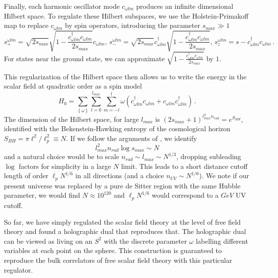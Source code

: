 \documentclass{brownthesis}
\begin{document}
Finally, each harmonic oscillator mode $c_{\omega lm}$ produces an
infinite dimensional Hilbert space. To regulate these Hilbert subspaces,
we use the Holstein-Primakoff map \cite{PhysRev.58.1098} to replace $c_{\omega lm}$
by spin operators, introducing the parameter $s_{max}\gg1$
\[
s_{+}^{\omega lm}=\sqrt{2s_{max}}\sqrt{1-\frac{c_{\omega lm}^{\dagger}c_{\omega lm}}{2s_{max}}}c_{\omega lm},\,s_{-}^{\omega lm}=\sqrt{2s_{max}}c_{\omega lm}^{\dagger}\sqrt{1-\frac{c_{\omega lm}^{\dagger}c_{\omega lm}}{2s_{max}}},\,s_{z}^{\omega lm}=s-c_{\omega lm}^{\dagger}c_{\omega lm}\,.
\]
 For states near the ground state, we can approximate $\sqrt{1-\frac{c_{\omega lm}^{\dagger}c_{\omega lm}}{2s_{max}}}$
by $1$.

This regularization of the Hilbert space then allows us to write the
energy in the scalar field at quadratic order as a spin model
\[
H_{0}=\sum_{\left\{ \omega\right\} }\sum_{l=0}^{l_{max}}\sum_{m=-l}^{l}\omega\left(c_{\omega lm}^{\dagger}c_{\omega lm}+c_{\omega lm}c_{\omega lm}^{\dagger}\right)\,.
\]
The dimension of the Hilbert space, for large $l_{max}$ is $(2s_{max}+1)^{l_{max}^{2}n_{rad}}=e^{S_{BH}}$,
identified with the Bekenstein-Hawking entropy of the cosmological
horizon $S_{BH}=\pi\ell^{2}/\ell_{p}^{2}\equiv N$. If we follow the
arguments of \cite{Cohen:1998zx}, we identify
\[
l_{max}^{2}n_{rad}\log s_{max}\sim N
\]
and a natural choice would be to scale $n_{rad}\sim l_{max}\sim N^{1/3}$,
dropping subleading $\log$ factors for simplicity in a large $N$
limit. This leads to a short distance cutoff length of order $\ell_{p}N^{1/6}$
in all directions (and a choice $n_{UV}\sim N^{1/6}$). We note if
our present universe was replaced by a pure de Sitter region with
the same Hubble parameter, we would find $N\approx10^{120}$ and $\ell_{p}N^{1/6}$
would correspond to a $GeV$ UV cutoff.

So far, we have simply regulated the scalar field theory at the level
of free field theory and found a holographic dual that reproduces
that. The holographic dual can be viewed as living on an $S^{2}$
with the discrete parameter $\omega$ labelling different variables
at each point on the sphere. This construction is guaranteed to reproduce
the bulk correlators of free scalar field theory with this particular
regulator.
\end{document}
